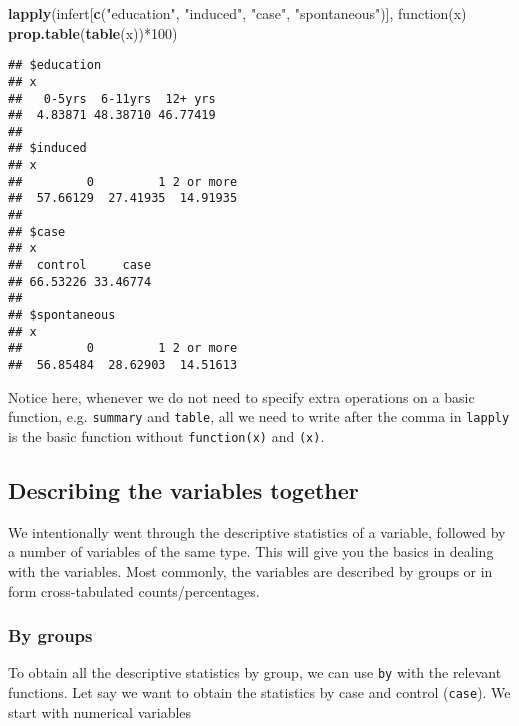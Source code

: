 \documentclass[]{book}
\newenvironment{Shaded}{\begin{snugshade}}{\end{snugshade}}
\newcommand{\KeywordTok}[1]{\textcolor[rgb]{0.13,0.29,0.53}{\textbf{{#1}}}}
\newcommand{\DecValTok}[1]{\textcolor[rgb]{0.00,0.00,0.81}{{#1}}}
\newcommand{\StringTok}[1]{\textcolor[rgb]{0.31,0.60,0.02}{{#1}}}
\newcommand{\NormalTok}[1]{{#1}}
\theoremstyle{definition}
\theoremstyle{definition}
\theoremstyle{remark}
\begin{document}
\begin{Shaded}
\begin{Highlighting}[]
\KeywordTok{lapply}\NormalTok{(infert[}\KeywordTok{c}\NormalTok{(}\StringTok{"education"}\NormalTok{, }\StringTok{"induced"}\NormalTok{, }\StringTok{"case"}\NormalTok{, }\StringTok{"spontaneous"}\NormalTok{)], }
       \NormalTok{function(x) }\KeywordTok{prop.table}\NormalTok{(}\KeywordTok{table}\NormalTok{(x))*}\DecValTok{100}\NormalTok{)}
\end{Highlighting}
\end{Shaded}

\begin{verbatim}
## $education
## x
##   0-5yrs  6-11yrs  12+ yrs 
##  4.83871 48.38710 46.77419 
## 
## $induced
## x
##         0         1 2 or more 
##  57.66129  27.41935  14.91935 
## 
## $case
## x
##  control     case 
## 66.53226 33.46774 
## 
## $spontaneous
## x
##         0         1 2 or more 
##  56.85484  28.62903  14.51613
\end{verbatim}

Notice here, whenever we do not need to specify extra operations on a
basic function, e.g. \texttt{summary} and \texttt{table}, all we need to
write after the comma in \texttt{lapply} is the basic function without
\texttt{function(x)} and \texttt{(x)}.

\subsection{Describing the variables
together}\label{describing-the-variables-together}

We intentionally went through the descriptive statistics of a variable,
followed by a number of variables of the same type. This will give you
the basics in dealing with the variables. Most commonly, the variables
are described by groups or in form cross-tabulated counts/percentages.

\subsubsection{By groups}\label{by-groups}

To obtain all the descriptive statistics by group, we can use
\texttt{by} with the relevant functions. Let say we want to obtain the
statistics by case and control (\texttt{case}). We start with numerical
variables

\begin{Shaded}
\end{Shaded}
\end{document}
